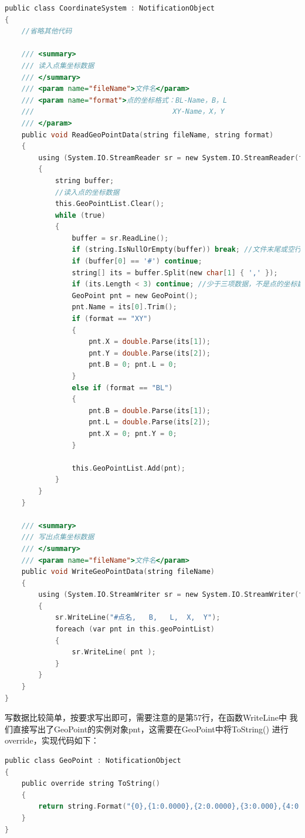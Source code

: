 \begin{lstlisting}[language=C]
public class CoordinateSystem : NotificationObject 
{
    //省略其他代码

    /// <summary>
    /// 读入点集坐标数据
    /// </summary>
    /// <param name="fileName">文件名</param>
    /// <param name="format">点的坐标格式：BL-Name，B，L  
    ///                                 XY-Name，X，Y
    /// </param>
    public void ReadGeoPointData(string fileName, string format)
    {
        using (System.IO.StreamReader sr = new System.IO.StreamReader(fileName) )
        {
            string buffer;
            //读入点的坐标数据
            this.GeoPointList.Clear();
            while (true)
            {
                buffer = sr.ReadLine();
                if (string.IsNullOrEmpty(buffer)) break; //文件末尾或空行退出
                if (buffer[0] == '#') continue;
                string[] its = buffer.Split(new char[1] { ',' });
                if (its.Length < 3) continue; //少于三项数据，不是点的坐标数据，忽略
                GeoPoint pnt = new GeoPoint();
                pnt.Name = its[0].Trim(); 
                if (format == "XY")
                {                       
                    pnt.X = double.Parse(its[1]); 
                    pnt.Y = double.Parse(its[2]);
                    pnt.B = 0; pnt.L = 0;
                }
                else if (format == "BL")
                {
                    pnt.B = double.Parse(its[1]); 
                    pnt.L = double.Parse(its[2]); 
                    pnt.X = 0; pnt.Y = 0;
                }
               
                this.GeoPointList.Add(pnt);
            }
        }
    }

    /// <summary>
    /// 写出点集坐标数据
    /// </summary>
    /// <param name="fileName">文件名</param>
    public void WriteGeoPointData(string fileName)
    {
        using (System.IO.StreamWriter sr = new System.IO.StreamWriter(fileName))
        {
            sr.WriteLine("#点名,   B,   L,  X,  Y");
            foreach (var pnt in this.geoPointList)
            {
                sr.WriteLine( pnt );
            }
        }
    }
}
\end{lstlisting}

写数据比较简单，按要求写出即可，需要注意的是第57行，在函数WriteLine中
我们直接写出了GeoPoint的实例对象pnt，这需要在GeoPoint中将ToString()
进行override，实现代码如下：
\begin{lstlisting}[language=C]
public class GeoPoint : NotificationObject
{
    public override string ToString()
    {
        return string.Format("{0},{1:0.0000},{2:0.0000},{3:0.000},{4:0.000}", Name, B, L, X, Y);
    }
}
\end{lstlisting}

